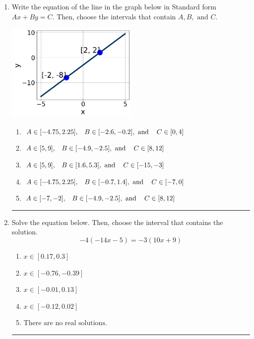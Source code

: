 \documentclass[14pt]{extbook}
\newcommand{\litem}[1]{\item#1\hspace*{-1cm}\rule{\textwidth}{0.4pt}}
\begin{document}
\begin{enumerate}
{\begin{enumerate}[label=\Alph*.]
\end{enumerate} }
\litem{
Write the equation of the line in the graph below in Standard form $Ax+By=C$. Then, choose the intervals that contain $A, B, \text{ and } C$.
\begin{center}
    \includegraphics[width=0.5\textwidth]{../Figures/linearGraphToStandardC.png}
\end{center}
\begin{enumerate}[label=\Alph*.]
\item \( A \in [-4.75, 2.25], \hspace{3mm} B \in [-2.6, -0.2], \text{ and } \hspace{3mm} C \in [0, 4] \)
\item \( A \in [5, 9], \hspace{3mm} B \in [-4.9, -2.5], \text{ and } \hspace{3mm} C \in [8, 12] \)
\item \( A \in [5, 9], \hspace{3mm} B \in [1.6, 5.3], \text{ and } \hspace{3mm} C \in [-15, -3] \)
\item \( A \in [-4.75, 2.25], \hspace{3mm} B \in [-0.7, 1.4], \text{ and } \hspace{3mm} C \in [-7, 0] \)
\item \( A \in [-7, -2], \hspace{3mm} B \in [-4.9, -2.5], \text{ and } \hspace{3mm} C \in [8, 12] \)

\end{enumerate} }
\litem{
Solve the equation below. Then, choose the interval that contains the solution.\[ -4(-14x -5) = -3(10x + 9) \]\begin{enumerate}[label=\Alph*.]
\item \( x \in [0.17, 0.3] \)
\item \( x \in [-0.76, -0.39] \)
\item \( x \in [-0.01, 0.13] \)
\item \( x \in [-0.12, 0.02] \)
\item \( \text{There are no real solutions.} \)


\end{enumerate}}
\end{enumerate}
\end{document}
